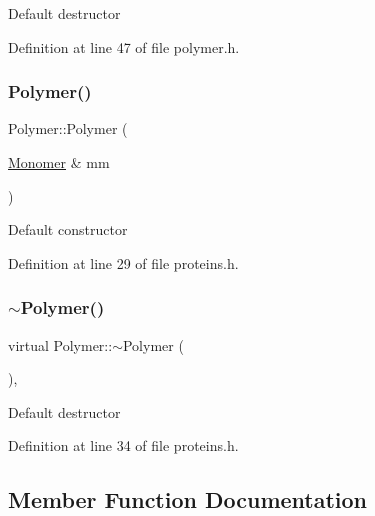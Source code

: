 Default destructor 

Definition at line 47 of file polymer.\+h.

\mbox{\label{class_polymer_ae77454a3908652e4df6a26b9cac509a5}} 
\subsubsection{\texorpdfstring{Polymer()}{Polymer()}\hspace{0.1cm}{\footnotesize\ttfamily [14/14]}}
{\footnotesize\ttfamily Polymer\+::\+Polymer (\begin{DoxyParamCaption}\item[{\mbox{\hyperlink{class_monomer}{Monomer}} \&}]{mm }\end{DoxyParamCaption})\hspace{0.3cm}{\ttfamily [inline]}}

Default constructor 

Definition at line 29 of file proteins.\+h.

\mbox{\label{class_polymer_aac2b3983f375a5691c7d5ca1a79594d5}} 
\subsubsection{\texorpdfstring{$\sim$\+Polymer()}{~Polymer()}\hspace{0.1cm}{\footnotesize\ttfamily [11/11]}}
{\footnotesize\ttfamily virtual Polymer\+::$\sim$\+Polymer (\begin{DoxyParamCaption}{ }\end{DoxyParamCaption})\hspace{0.3cm}{\ttfamily [inline]}, {\ttfamily [virtual]}}

Default destructor 

Definition at line 34 of file proteins.\+h.



\subsection{Member Function Documentation}
\mbox{\label{class_polymer_a1daba3eb2ba8428bf2f3e814668b155f}} 
